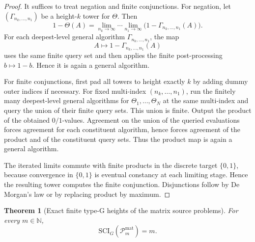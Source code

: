 \documentclass{lmcs} %
\theoremstyle{plain}
\theoremstyle{plain}
\newtheorem{theorem}{Theorem}[section]
\theoremstyle{definition}
\theoremstyle{remark}
\theoremstyle{definition}
\theoremstyle{remark}
\numberwithin{equation}{section}
\begin{document}
\begin{proof}
It suffices to treat negation and finite conjunctions. For negation, let \((\Gamma_{n_k,\ldots,n_1})\) be a height-\(k\) tower for \(\Theta\). Then
\[
        1-\Theta(A)
        =
        \lim_{n_k\to\infty}\cdots\lim_{n_1\to\infty}
        \bigl(1-\Gamma_{n_k,\ldots,n_1}(A)\bigr).
\]
For each deepest-level general algorithm \(\Gamma_{n_k,\ldots,n_1}\), the map
\[
        A\mapsto 1-\Gamma_{n_k,\ldots,n_1}(A)
\]
uses the same finite query set and then applies the finite post-processing \(b\mapsto 1-b\). Hence it is again a general algorithm.

For finite conjunctions, first pad all towers to height exactly \(k\) by adding dummy outer indices if necessary. For fixed multi-index \((n_k,\ldots,n_1)\), run the finitely
many deepest-level general algorithms for \(\Theta_1,\ldots,\Theta_N\) at the same
multi-index and query the union of their finite query sets. This union is finite.
Output the product of the obtained \(0/1\)-values. Agreement on the union of the
queried evaluations forces agreement for each constituent algorithm, hence forces
agreement of the product and of the constituent query sets.  Thus the product map is
again a general algorithm.

The iterated limits commute with finite products in the discrete target
\(\{0,1\}\), because convergence in \(\{0,1\}\) is eventual constancy at each limiting
stage. Hence the resulting tower computes the finite conjunction. Disjunctions follow
by De Morgan's law or by replacing product by maximum.
\end{proof}

\begin{theorem}[Exact finite type-G heights of the matrix source problems]\label{thm:Xi-m-exact-height}
For every \(m\in \mathbb{N}\),
\[
\mathrm{SCI}_G(\mathcal P_m^{\mathrm{mat}})=m.
\]
\end{theorem}
\end{document}
